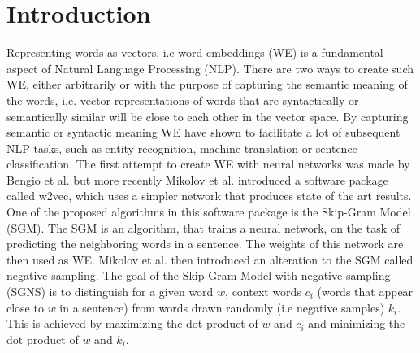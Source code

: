 \section{Introduction}\label{sec:introduction}

Representing words as vectors, i.e word embeddings (WE) is a fundamental aspect of Natural Language Processing (NLP). There are two ways to create such WE, either arbitrarily or with the purpose of capturing the semantic meaning of the words, i.e. vector representations of words that are syntactically or semantically similar will be close to each other in the vector space. By capturing semantic or syntactic meaning WE have shown to facilitate a lot of subsequent NLP tasks, such as entity recognition, machine translation or sentence classification. 
The first attempt to create WE with neural networks was made by Bengio et al. \citep{bengio} but more recently Mikolov et al. \citep{mikolov} introduced a software package called w2vec, which uses a simpler network that produces state of the art results. One of the proposed algorithms in this software package is the Skip-Gram Model (SGM). The SGM is an algorithm, that trains a neural network, on the task of predicting the neighboring words in a sentence. The weights of this network are then used as WE. Mikolov et al. \citep{mikolov2} then introduced an alteration to the SGM called negative sampling. The goal of the Skip-Gram Model with negative sampling (SGNS) is to distinguish for a given word $w$, context words $c_i$ (words that appear close to $w$ in a sentence) from words drawn randomly (i.e negative samples) $k_i$. This is achieved by maximizing the dot product of $w$ and $c_i$ and minimizing the dot product of $w$ and $k_i$.\\
